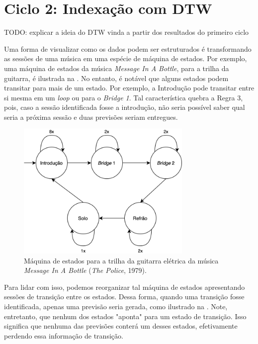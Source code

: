 \chapter{Ciclo 2: Indexação com DTW}
\label{chap:dtw}

TODO: explicar a ideia do DTW vinda a partir dos resultados do primeiro ciclo

Uma forma de visualizar como os dados podem ser estruturados é transformando as sessões de uma música em uma espécie de máquina de estados. Por exemplo, uma máquina de estados da música \textit{Message In A Bottle}, para a trilha da guitarra, é ilustrada na . No entanto, é notável que alguns estados podem transitar para mais de um estado. Por exemplo, a Introdução pode transitar entre si mesma em um \textit{loop} ou para o \textit{Bridge 1}. Tal característica quebra a Regra 3, pois, caso a sessão identificada fosse a introdução, não seria possível saber qual seria a próxima sessão e duas previsões seriam entregues.

\begin{figure}[htbp]
    \centering
    \includegraphics[width=0.75\textwidth]{images/MIAB state machine.png}
    \caption{Máquina de estados para a trilha da guitarra elétrica da música \textit{Message In A Bottle} (\textit{The Police}, 1979).}
    \label{fig:miab_state_machine}
\end{figure}

Para lidar com isso, podemos reorganizar tal máquina de estados apresentando sessões de transição entre os estados. Dessa forma, quando uma transição fosse identificada, apenas uma previsão seria gerada, como ilustrado na . Note, entretanto, que nenhum dos estados "aponta" para um estado de transição. Isso significa que nenhuma das previsões conterá um desses estados, efetivamente perdendo essa informação de transição.

